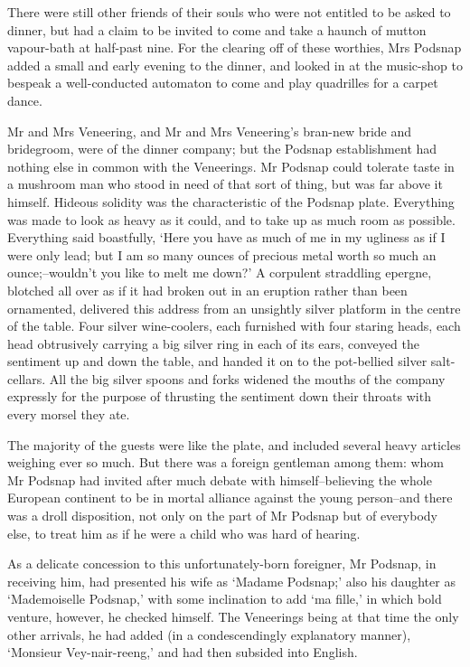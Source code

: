 There were still other friends of their souls who were not entitled to
be asked to dinner, but had a claim to be invited to come and take a
haunch of mutton vapour-bath at half-past nine. For the clearing off
of these worthies, Mrs Podsnap added a small and early evening to the
dinner, and looked in at the music-shop to bespeak a well-conducted
automaton to come and play quadrilles for a carpet dance.

Mr and Mrs Veneering, and Mr and Mrs Veneering’s bran-new bride and
bridegroom, were of the dinner company; but the Podsnap establishment
had nothing else in common with the Veneerings. Mr Podsnap could
tolerate taste in a mushroom man who stood in need of that sort
of thing, but was far above it himself. Hideous solidity was the
characteristic of the Podsnap plate. Everything was made to look as
heavy as it could, and to take up as much room as possible. Everything
said boastfully, ‘Here you have as much of me in my ugliness as if I
were only lead; but I am so many ounces of precious metal worth so much
an ounce;--wouldn’t you like to melt me down?’ A corpulent straddling
epergne, blotched all over as if it had broken out in an eruption rather
than been ornamented, delivered this address from an unsightly silver
platform in the centre of the table. Four silver wine-coolers, each
furnished with four staring heads, each head obtrusively carrying a big
silver ring in each of its ears, conveyed the sentiment up and down the
table, and handed it on to the pot-bellied silver salt-cellars. All the
big silver spoons and forks widened the mouths of the company expressly
for the purpose of thrusting the sentiment down their throats with every
morsel they ate.

The majority of the guests were like the plate, and included several
heavy articles weighing ever so much. But there was a foreign gentleman
among them: whom Mr Podsnap had invited after much debate with
himself--believing the whole European continent to be in mortal alliance
against the young person--and there was a droll disposition, not only on
the part of Mr Podsnap but of everybody else, to treat him as if he were
a child who was hard of hearing.

As a delicate concession to this unfortunately-born foreigner, Mr
Podsnap, in receiving him, had presented his wife as ‘Madame Podsnap;’
also his daughter as ‘Mademoiselle Podsnap,’ with some inclination to
add ‘ma fille,’ in which bold venture, however, he checked himself. The
Veneerings being at that time the only other arrivals, he had added (in
a condescendingly explanatory manner), ‘Monsieur Vey-nair-reeng,’ and
had then subsided into English.

